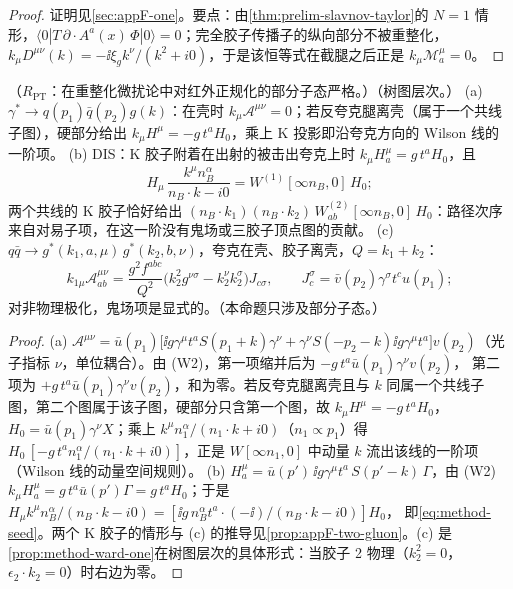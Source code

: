 \begin{proof}
证明见\cref{sec:appF-one}。要点：由\cref{thm:prelim-slavnov-taylor}的 $N=1$ 情形，$\langle0|T\,\partial\cdot A^a(x)\,\Phi|0\rangle=0$；完全胶子传播子的纵向部分不被重整化，
$k_\mu D^{\mu\nu}(k)=-\ii\xi_gk^\nu/(k^2+i0)$，于是该恒等式在截腿之后正是 $k_\mu\mathcal M^\mu_a=0$。
\end{proof}

\begin{proposition}\label{prop:method-ward-tree}
（$R_{\mathrm{PT}}$：在重整化微扰论中对红外正规化的部分子态严格。）（树图层次。）
(a) $\gamma^*\to q(p_1)\bar q(p_2)g(k)$：在壳时 $k_\mu\mathcal A^{\mu\nu}=0$；若反夸克腿离壳（属于一个共线子图），硬部分给出 $k_\mu H^\mu=-g\,t^aH_0$，乘上 K 投影即沿夸克方向的 Wilson 线的一阶项。
(b) DIS：K 胶子附着在出射的被击出夸克上时 $k_\mu H^\mu_a=g\,t^aH_0$，且
\begin{equation}\label{eq:method-seed}
H_\mu\,\frac{k^\mu n_B^\alpha}{n_B\cdot k-i0}=W^{(1)}[\infty n_B,0]\,H_0 ;
\end{equation}
两个共线的 K 胶子恰好给出 $(n_B\cdot k_1)(n_B\cdot k_2)\,W^{(2)}_{ab}[\infty n_B,0]\,H_0$：路径次序来自对易子项，在这一阶没有鬼场或三胶子顶点图的贡献。
(c) $q\bar q\to g^*(k_1,a,\mu)\,g^*(k_2,b,\nu)$，夸克在壳、胶子离壳，$Q=k_1+k_2$：
\begin{equation}\label{eq:method-qqgg}
k_{1\mu}\mathcal A^{\mu\nu}_{ab}=\frac{g^2f^{abc}}{Q^2}\bigl(k_2^2g^{\nu\sigma}-k_2^\nu k_2^\sigma\bigr)J_{c\sigma},\qquad J_c^\sigma=\bar v(p_2)\gamma^\sigma t^cu(p_1) ;
\end{equation}
对非物理极化，鬼场项是显式的。（本命题只涉及部分子态。）
\end{proposition}

\begin{proof}
(a) $\mathcal A^{\mu\nu}=\bar u(p_1)\bigl[\ii g\gamma^\mu t^aS(p_1+k)\gamma^\nu+\gamma^\nu S(-p_2-k)\ii g\gamma^\mu t^a\bigr]v(p_2)$（光子指标 $\nu$，单位耦合）。由 (W2)，第一项缩并后为 $-g\,t^a\bar u(p_1)\gamma^\nu v(p_2)$，
第二项为 $+g\,t^a\bar u(p_1)\gamma^\nu v(p_2)$，和为零。若反夸克腿离壳且与 $k$ 同属一个共线子图，第二个图属于该子图，硬部分只含第一个图，故 $k_\mu H^\mu=-g\,t^aH_0$，
$H_0=\bar u(p_1)\gamma^\nu X$；乘上 $k^\mu n_1^\alpha/(n_1\cdot k+i0)$（$n_1\propto p_1$）得 $H_0\,[-g\,t^an_1^\alpha/(n_1\cdot k+i0)]$，正是 $W[\infty n_1,0]$ 中动量 $k$ 流出该线的一阶项（Wilson 线的动量空间规则）。
(b) $H^\mu_a=\bar u(p')\,\ii g\gamma^\mu t^a\,S(p'-k)\,\Gamma$，由 (W2) $k_\mu H^\mu_a=g\,t^a\bar u(p')\Gamma=g\,t^aH_0$；于是 $H_\mu k^\mu n_B^\alpha/(n_B\cdot k-i0)=[\ii g\,n_B^\alpha t^a\cdot(-\ii)/(n_B\cdot k-i0)]H_0$，
即\cref{eq:method-seed}。两个 K 胶子的情形与 (c) 的推导见\cref{prop:appF-two-gluon}。(c) 是\cref{prop:method-ward-one}在树图层次的具体形式：当胶子 2 物理（$k_2^2=0$，$\epsilon_2\cdot k_2=0$）时右边为零。
\end{proof}

